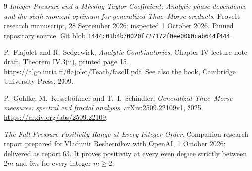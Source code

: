 \documentclass[11pt,a4paper]{article}
\theoremstyle{remark}\newtheorem*{ednote}{Editorial note (ProveIt, 2026-10-01)}
\begin{document}
\begin{thebibliography}{9}
\emph{Integer Pressure and a Missing Taylor Coefficient: Analytic phase dependence and the sixth-moment optimum for generalized Thue--Morse products}.
ProveIt research manuscript, 28 September 2026; inspected 1 October 2026.
\href{https://github.com/VladimirReshetnikov/ProveIt/blob/63a7a325109ba611a1816b61dfd0eb072b896a7a/Analysis/FabiusFunction/docs/semi-formalized-research-frontiers/drafts/thue-morse/Thue_Morse_Integer_Pressure/article.tex}{Pinned repository source}.
Git blob \texttt{1444c01b4b30020f727172f0ee0060cab644f444}.

P.~Flajolet and R.~Sedgewick,
\emph{Analytic Combinatorics}, Chapter IV lecture-note draft,
Theorem IV.3(ii), printed page 15.
\url{https://algo.inria.fr/flajolet/Teach/fascII.pdf}.
See also the book, Cambridge University Press, 2009.

P.~Gohlke, M.~Kesseb\"ohmer and T.~I.~Schindler,
\emph{Generalized Thue--Morse measures: spectral and fractal analysis},
arXiv:2509.22109v1, 2025.
\url{https://arxiv.org/abs/2509.22109}.

\emph{The Full Pressure Positivity Range at Every Integer Order}.
Companion research report prepared for Vladimir Reshetnikov with OpenAI,
1 October 2026; delivered as report 63.
It proves positivity at every even degree strictly between $2m$ and $6m$ for every integer $m\ge2$.
\end{thebibliography}
\end{document}
